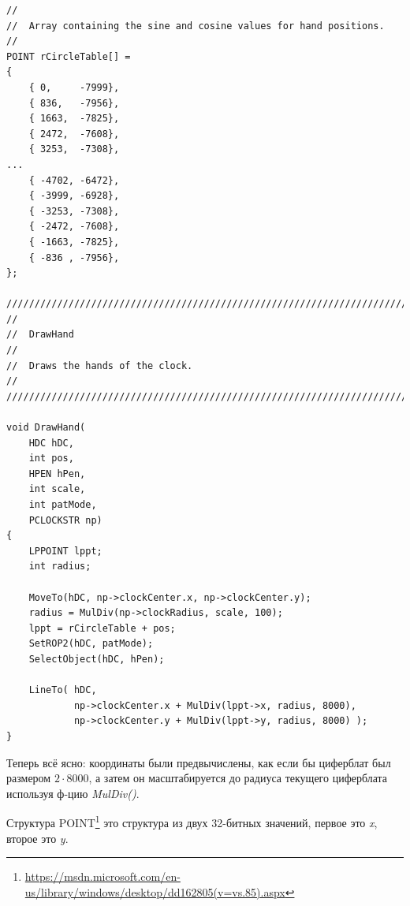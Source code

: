 \begin{lstlisting}[style=customc]
//
//  Array containing the sine and cosine values for hand positions.
//
POINT rCircleTable[] =
{
    { 0,     -7999},
    { 836,   -7956},
    { 1663,  -7825},
    { 2472,  -7608},
    { 3253,  -7308},
...
    { -4702, -6472},
    { -3999, -6928},
    { -3253, -7308},
    { -2472, -7608},
    { -1663, -7825},
    { -836 , -7956},
};

////////////////////////////////////////////////////////////////////////////
//
//  DrawHand
//
//  Draws the hands of the clock.
//
////////////////////////////////////////////////////////////////////////////

void DrawHand(
    HDC hDC,
    int pos,
    HPEN hPen,
    int scale,
    int patMode,
    PCLOCKSTR np)
{
    LPPOINT lppt;
    int radius;

    MoveTo(hDC, np->clockCenter.x, np->clockCenter.y);
    radius = MulDiv(np->clockRadius, scale, 100);
    lppt = rCircleTable + pos;
    SetROP2(hDC, patMode);
    SelectObject(hDC, hPen);

    LineTo( hDC,
            np->clockCenter.x + MulDiv(lppt->x, radius, 8000),
            np->clockCenter.y + MulDiv(lppt->y, radius, 8000) );
}
\end{lstlisting}

Теперь всё ясно: координаты были предвычислены, как если бы циферблат был размером $2 \cdot 8000$,
а затем он масштабируется до радиуса текущего циферблата используя ф-цию \emph{MulDiv()}.

Структура POINT\footnote{\url{https://msdn.microsoft.com/en-us/library/windows/desktop/dd162805(v=vs.85).aspx}}
это структура из двух 32-битных значений, первое это \emph{x}, второе это \emph{y}.

